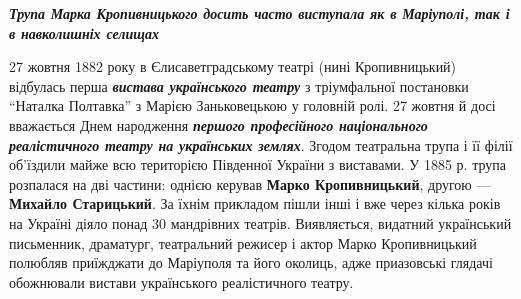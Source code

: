  
 
 
 
 


\begin{center}
  \em\color{blue}\bfseries\Large
Трупа Марка Кропивницького досить часто виступала як в Маріуполі, так і в навколишніх селищах
\end{center}

27 жовтня 1882 року в Єлисаветградському театрі (нині Кропивницький) відбулась
перша \emph{\textbf{вистава українського театру}} з тріумфальної постановки \enquote{Наталка Полтавка}
з Марією Заньковецькою у головній ролі. 27 жовтня й досі вважається Днем
народження \textbf{\emph{першого професійного національного реалістичного театру на
українських землях}}. Згодом театральна трупа і її філії об'їздили майже всю
територією Південної України з виставами. У 1885 р. трупа розпалася на дві
частини: однією керував \textbf{Марко Кропивницький}, другою — \textbf{Михайло Старицький}. За
їхнім прикладом пішли інші і вже через кілька років на Україні діяло понад 30
мандрівних театрів. Виявляється, видатний український письменник, драматург,
театральний режисер і актор Марко Кропивницький полюбляв приїжджати до
Маріуполя та його околиць, адже приазовські глядачі обожнювали вистави
українського реалістичного театру.

